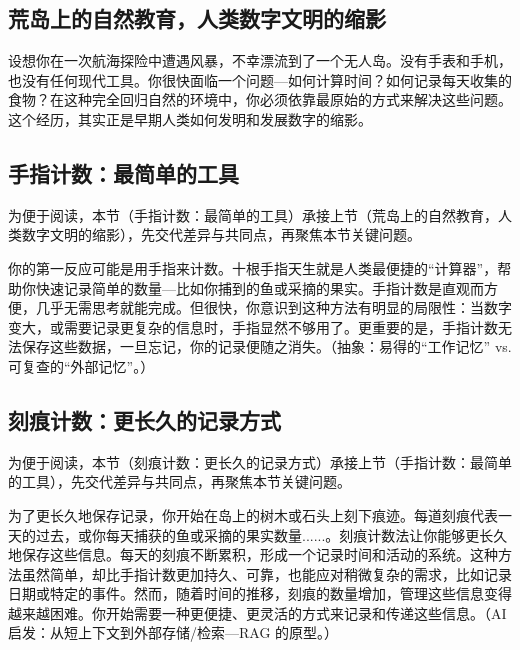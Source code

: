 \subsection{荒岛上的自然教育，人类数字文明的缩影}


设想你在一次航海探险中遭遇风暴，不幸漂流到了一个无人岛。没有手表和手机，也没有任何现代工具。你很快面临一个问题---如何计算时间？如何记录每天收集的食物？在这种完全回归自然的环境中，你必须依靠最原始的方式来解决这些问题。这个经历，其实正是早期人类如何发明和发展数字的缩影。
\subsection*{手指计数：最简单的工具}


为便于阅读，本节（手指计数：最简单的工具）承接上节（荒岛上的自然教育，人类数字文明的缩影），先交代差异与共同点，再聚焦本节关键问题。

你的第一反应可能是用手指来计数。十根手指天生就是人类最便捷的“计算器”，帮助你快速记录简单的数量---比如你捕到的鱼或采摘的果实。手指计数是直观而方便，几乎无需思考就能完成。但很快，你意识到这种方法有明显的局限性：当数字变大，或需要记录更复杂的信息时，手指显然不够用了。更重要的是，手指计数无法保存这些数据，一旦忘记，你的记录便随之消失。{（抽象：易得的“工作记忆” vs. 可复查的“外部记忆”。）}
\subsection*{刻痕计数：更长久的记录方式}


为便于阅读，本节（刻痕计数：更长久的记录方式）承接上节（手指计数：最简单的工具），先交代差异与共同点，再聚焦本节关键问题。

为了更长久地保存记录，你开始在岛上的树木或石头上刻下痕迹。每道刻痕代表一天的过去，或你每天捕获的鱼或采摘的果实数量......。刻痕计数法让你能够更长久地保存这些信息。每天的刻痕不断累积，形成一个记录时间和活动的系统。这种方法虽然简单，却比手指计数更加持久、可靠，也能应对稍微复杂的需求，比如记录日期或特定的事件。然而，随着时间的推移，刻痕的数量增加，管理这些信息变得越来越困难。你开始需要一种更便捷、更灵活的方式来记录和传递这些信息。{（AI 启发：从短上下文到外部存储/检索---RAG 的原型。）}

